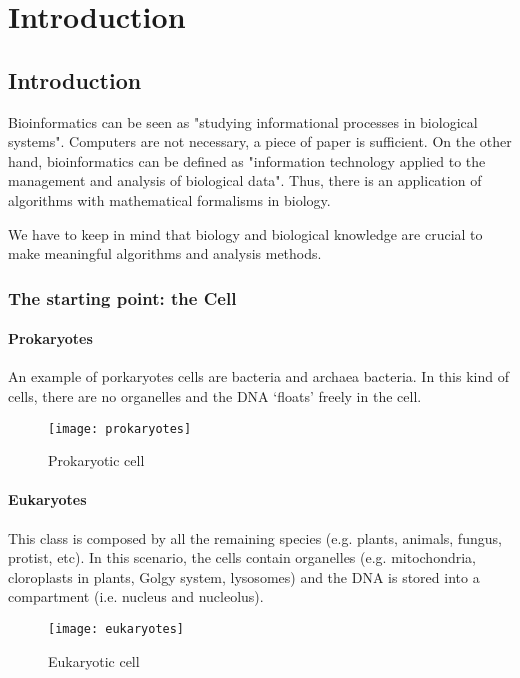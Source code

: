 \chapter{Introduction}

\section{Introduction}

Bioinformatics can be seen as "studying informational processes in biological 
systems". Computers are not necessary, a piece of paper is sufficient.
On the other hand, bioinformatics can be defined as "information technology 
applied to the management and analysis of biological data". Thus, there is an 
application of algorithms with mathematical formalisms in biology.

We have to keep in mind that biology and biological knowledge are crucial to 
make meaningful algorithms and analysis methods.

\subsection{The starting point: the Cell}

\subsubsection{Prokaryotes}

An example of porkaryotes cells are bacteria and archaea bacteria. In this kind 
of cells, there are no organelles and the DNA `floats' freely in the cell.

\begin{figure}[!htpb]
\centering
\texttt{[image: prokaryotes]}
\caption{Prokaryotic cell}
\label{Prokaryotic cell}
\end{figure}

\subsubsection{Eukaryotes}

This class is composed by all the remaining species (e.g. plants, animals, 
fungus, protist, etc). In this scenario, the cells contain organelles (e.g. 
mitochondria, cloroplasts in plants, Golgy system, lysosomes) and the DNA is 
stored into a compartment (i.e. nucleus and nucleolus).

\begin{figure}[!htpb]
\centering
\texttt{[image: eukaryotes]}
\caption{Eukaryotic cell}
\label{Eukaryotic cell}
\end{figure}

